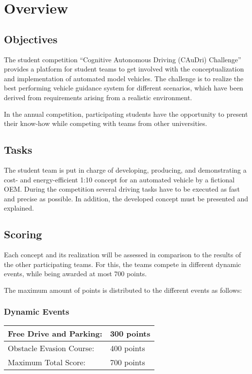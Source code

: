 \chapter{Overview}

\section{Objectives}

The student competition “Cognitive Autonomous Driving (CAuDri) Challenge”
provides a platform for student teams to get involved with the
conceptualization and implementation of automated model vehicles. The challenge
is to realize the best performing vehicle guidance system for different
scenarios, which have been derived from requirements arising from a realistic
environment.

In the annual competition, participating students have the opportunity to
present their know-how while competing with teams from other universities.

\section{Tasks}

The student team is put in charge of developing, producing, and demonstrating a
cost- and energy-efficient 1:10 concept for an automated vehicle by a fictional
OEM. During the competition several driving tasks have to be executed as fast
and precise as possible. In addition, the developed concept must be presented
and explained.

\section{Scoring}

Each concept and its realization will be assessed in comparison to the results
of the other participating teams. For this, the teams compete in different
dynamic events, while being awarded at most 700 points.

The maximum amount of points is distributed to the different events as follows:

\subsection{Dynamic Events}

\begin{table}[h]
	\begin{tabular}{|l|l|}
		\hline
		Free Drive and Parking:  & 300 points \\ \hline
		Obstacle Evasion Course: & 400 points \\ \hline\hline
		Maximum Total Score:     & 700 points \\ \hline
	\end{tabular}
\end{table}